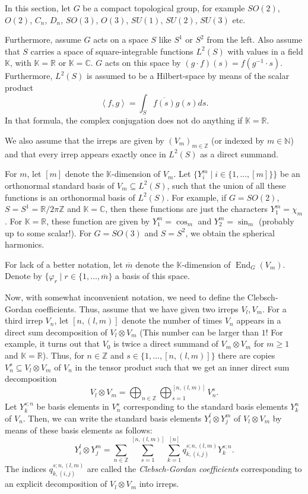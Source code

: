 \documentclass[12pt, a4paper]{article}
\theoremstyle{plain}
\theoremstyle{definition}
\theoremstyle{remark}
\newcommand{\N}{\mathds{N}}
\newcommand{\Z}{\mathds{Z}}
\newcommand{\R}{\mathds{R}}
\newcommand{\C}{\mathds{C}}
\newcommand{\K}{\mathds{K}}
\DeclareMathOperator{\End}{End}
\begin{document}
In this section, let $G$ be a compact topological group, for example $SO(2)$, $O(2)$, $C_n$, $D_n$, $SO(3)$, $O(3)$, $SU(1)$, $SU(2)$, $SU(3)$ etc.

Furthermore, assume $G$ acts on a space $S$ like $S^1$ or $S^2$ from the left. Also assume that $S$ carries a space of square-integrable functions $L^2(S)$ with values in a field $\K$, with $\K = \R$ or $\K = \C$. $G$ acts on this space by $(g \cdot f)(s) = f(g^{-1} \cdot s)$. Furthermore, $L^2(S)$ is assumed to be a Hilbert-space by means of the scalar product
\begin{equation*}
\left\langle f, g \right\rangle = \int_{S} \overline{f(s)} g(s) ds.
\end{equation*}
In that formula, the complex conjugation does not do anything if $\K = \R$. 

We also assume that the irreps are given by $(V_m)_{m \in \Z}$ (or indexed by $m \in \N$) and that every irrep appears exactly once in $L^2(S)$ as a direct summand. 

For $m$, let $[m]$ denote the $\K$-dimension of $V_m$. Let $\{Y^m_i \mid i \in \{1, \dots, [m] \}\}$ be an orthonormal standard basis of $V_m \subseteq L^2(S)$, such that the union of all these functions is an orthonormal basis of $L^2(S)$. For example, if $G = SO(2)$, $S = S^1 = \R/{2\pi\Z}$ and $\K = \C$, then these functions are just the characters $Y^m_1 = \chi_{m}$. For $\K = \R$, these function are given by $Y^m_1 = \cos_m$ and $Y^m_2 = \sin_m$ (probably up to some scalar!). For $G = SO(3)$ and $S = S^2$, we obtain the spherical harmonics.

For lack of a better notation, let $\overline{m}$ denote the $\K$-dimension of $\End_G(V_m)$. Denote by $\{ \varphi_r \mid r \in \{1 ,\dots, \overline{m} \}$ a basis of this space.

Now, with somewhat inconvenient notation, we need to define the Clebsch-Gordan coefficients. Thus, assume that we have given two irreps $V_l, V_m$. For a third irrep $V_n$, let $[n,(l,m)]$ denote the number of times $V_n$ appears in a direct sum decomposition of $V_l \otimes V_m$ (This number can be larger than $1$! For example, it turns out that $V_0$ is twice a direct summand of $V_m \otimes V_m$ for $m \geq 1$ and $\K = \R$). Thus, for $n \in \Z$ and $s \in \{1, \dots, [n,(l,m)]\}$ there are copies $V_n^s \subseteq V_l \otimes V_m$ of $V_n$ in the tensor product such that we get an inner direct sum decomposition
\begin{equation*}
V_l \otimes V_m = \bigoplus_{n \in \Z} \bigoplus_{s = 1}^{[n,(l,m)]} V_n^s.
\end{equation*}
Let $Y_k^{s;n}$ be basis elements in $V_n^s$ corresponding to the standard basis elements $Y_k^n$ of $V_n$. Then, we can write the standard basis elements $Y_i^l \otimes Y_j^m$ of $V_l \otimes V_m$ by means of these basis elements as follows:
\begin{equation*}
Y_i^l \otimes Y_j^m = \sum_{n \in \Z} \sum_{s = 1}^{[n, (l,m) ]} \sum_{k = 1}^{[n]} q_{k,(i,j)}^{s; n, (l,m)}Y_k^{s; n}.
\end{equation*}
The indices $q_{k,(i,j)}^{s;n,(l,m)}$ are called the \emph{Clebsch-Gordan coefficients} corresponding to an explicit decomposition of $V_l \otimes V_m$ into irreps.
\end{document}
